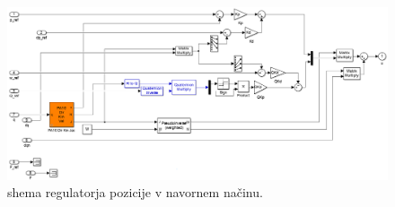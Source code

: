 \begin{figure}
	\centering
	\includegraphics[trim={0 0cm 0 0cm},scale=0.25]{./Slike/zunanje_koordinate_tq.png}
	\caption{\simulink shema regulatorja pozicije v navornem na\v{c}inu.}
	\label{fig:zunanje_koordinate_tq}
\end{figure}
